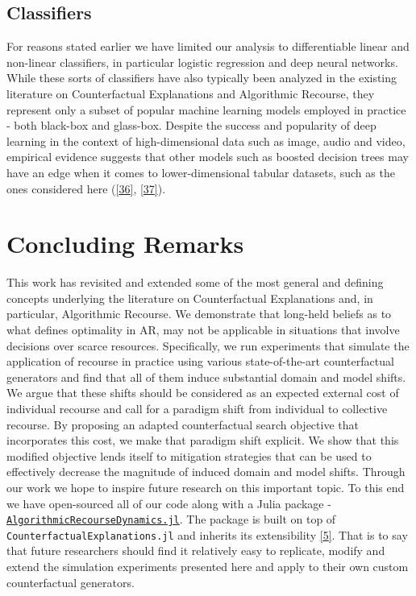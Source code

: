 \documentclass[conference,final,]{IEEEtran}
\begin{document}
\hypertarget{classifiers}{%
\subsection{Classifiers}\label{classifiers}}

For reasons stated earlier we have limited our analysis to differentiable linear and non-linear classifiers, in particular logistic regression and deep neural networks. While these sorts of classifiers have also typically been analyzed in the existing literature on Counterfactual Explanations and Algorithmic Recourse, they represent only a subset of popular machine learning models employed in practice - both black-box and glass-box. Despite the success and popularity of deep learning in the context of high-dimensional data such as image, audio and video, empirical evidence suggests that other models such as boosted decision trees may have an edge when it comes to lower-dimensional tabular datasets, such as the ones considered here (\protect\hyperlink{ref-borisov2021deep}{{[}36{]}}, \protect\hyperlink{ref-grinsztajn2022tree}{{[}37{]}}).

\hypertarget{conclusion}{%
\section{Concluding Remarks}\label{conclusion}}

This work has revisited and extended some of the most general and defining concepts underlying the literature on Counterfactual Explanations and, in particular, Algorithmic Recourse. We demonstrate that long-held beliefs as to what defines optimality in AR, may not be applicable in situations that involve decisions over scarce resources. Specifically, we run experiments that simulate the application of recourse in practice using various state-of-the-art counterfactual generators and find that all of them induce substantial domain and model shifts. We argue that these shifts should be considered as an expected external cost of individual recourse and call for a paradigm shift from individual to collective recourse. By proposing an adapted counterfactual search objective that incorporates this cost, we make that paradigm shift explicit. We show that this modified objective lends itself to mitigation strategies that can be used to effectively decrease the magnitude of induced domain and model shifts. Through our work we hope to inspire future research on this important topic. To this end we have open-sourced all of our code along with a Julia package - \href{https://anonymous.4open.science/r/AlgorithmicRecourseDynamics/README.md}{\texttt{AlgorithmicRecourseDynamics.jl}}. The package is built on top of \texttt{CounterfactualExplanations.jl} and inherits its extensibility \protect\hyperlink{ref-altmeyer2022CounterfactualExplanations}{{[}5{]}}. That is to say that future researchers should find it relatively easy to replicate, modify and extend the simulation experiments presented here and apply to their own custom counterfactual generators.
\end{document}

